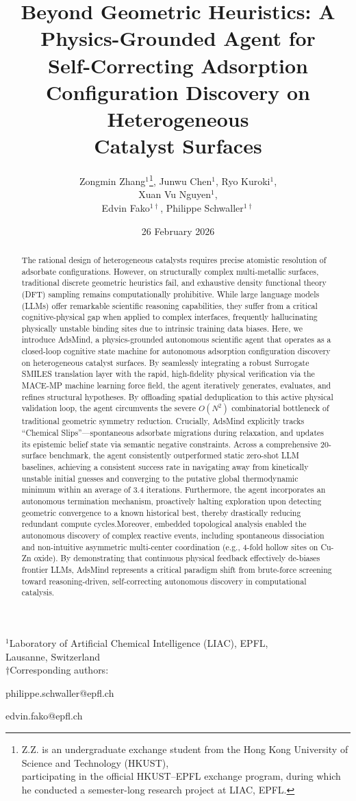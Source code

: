 \documentclass{article}
\title{Beyond Geometric Heuristics: A Physics-Grounded Agent for\\
Self-Correcting Adsorption Configuration Discovery on Heterogeneous\\
Catalyst Surfaces}
\author{
Zongmin Zhang$^{1}$\thanks{Z.Z. is an undergraduate exchange student from the Hong Kong University of Science and Technology (HKUST),\\
participating in the official HKUST--EPFL exchange program, during which he conducted a semester-long research project at LIAC, EPFL.},
Junwu Chen$^{1}$,
Ryo Kuroki$^{1}$,\\
Xuan Vu Nguyen$^{1}$,\\
Edvin Fako$^{1\dagger}$,
Philippe Schwaller$^{1\dagger}$
}
\date{26 February 2026}
\begin{document}
\begingroup\sloppy
\maketitle
\endgroup

\begin{center}
$^{1}$Laboratory of Artificial Chemical Intelligence (LIAC), EPFL,\\
Lausanne, Switzerland\\
$\dagger$Corresponding authors:

philippe.schwaller@epfl.ch

edvin.fako@epfl.ch
\end{center}

\begin{abstract}
The rational design of heterogeneous catalysts requires precise atomistic resolution of adsorbate configurations. However, on structurally complex multi-metallic surfaces, traditional discrete geometric heuristics fail, and exhaustive density functional theory (DFT) sampling remains computationally prohibitive. While large language models (LLMs) offer remarkable scientific reasoning capabilities, they suffer from a critical cognitive-physical gap when applied to complex interfaces, frequently hallucinating physically unstable binding sites due to intrinsic training data biases. Here, we introduce AdsMind, a physics-grounded autonomous scientific agent that operates as a closed-loop cognitive state machine for autonomous adsorption configuration discovery on heterogeneous catalyst surfaces. By seamlessly integrating a robust Surrogate SMILES translation layer with the rapid, high-fidelity physical verification via the MACE-MP machine learning force field, the agent iteratively generates, evaluates, and refines structural hypotheses. By offloading spatial deduplication to this active physical validation loop, the agent circumvents the severe $O(N^2)$ combinatorial bottleneck of traditional geometric symmetry reduction. Crucially, AdsMind explicitly tracks ``Chemical Slips''---spontaneous adsorbate migrations during relaxation, and updates its epistemic belief state via semantic negative constraints. Across a comprehensive 20-surface benchmark, the agent consistently outperformed static zero-shot LLM baselines, achieving a consistent success rate in navigating away from kinetically unstable initial guesses and converging to the putative global thermodynamic minimum within an average of 3.4 iterations. Furthermore, the agent incorporates an autonomous termination mechanism, proactively halting exploration upon detecting geometric convergence to a known historical best, thereby drastically reducing redundant compute cycles.Moreover, embedded topological analysis enabled the autonomous discovery of complex reactive events, including spontaneous dissociation and non-intuitive asymmetric multi-center coordination (e.g., 4-fold hollow sites on Cu-Zn oxide). By demonstrating that continuous physical feedback effectively de-biases frontier LLMs, AdsMind represents a critical paradigm shift from brute-force screening toward reasoning-driven, self-correcting autonomous discovery in computational catalysis.
\end{abstract}
\end{document}
